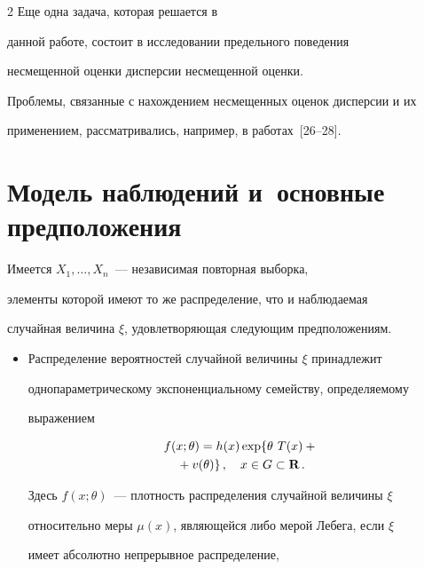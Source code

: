 \begin{multicols}{2}
    Еще одна задача, которая решается в


  данной работе, состоит в исследовании предельного поведения


  несмещенной оценки дисперсии несмещенной оценки.


   Проблемы, связанные с нахождением несмещенных оценок дисперсии и их


   применением, рас\-смат\-ри\-ва\-лись, например, в работах~[26--28].





  \section{Модель наблюдений и~основные предположения}





   Имеется $X_1,\ldots,X_n$~--- независимая повторная выборка,


  элементы которой имеют то же распределение, что и наблюдаемая


  случайная величина $\xi$, удовлетворяющая следующим предположениям.


{\addtolength{\leftmargini}{10pt}


  \begin{itemize}


  \item[$(A_1).$]


 Распределение вероятностей случайной величины $\xi$ принадлежит


 однопараметрическому экспоненциальному  семейству, определяемому


 выражением


\begin{multline}


f(x;\theta)=h(x) \exp\{\theta~T(x)+{}\\


{}+v(\theta)\}\,,


\quad x\in G\subset \Rp\,.


\label{e1c}


 \end{multline}


  Здесь $f(x;\theta)$~--- плотность распределения случайной величины $\xi$


 относительно меры $\mu(x)$, являющейся либо мерой Лебега, если $\xi$


 имеет абсолютно непрерывное распределение,\linebreak



\end{itemize}}
\end{multicols}
